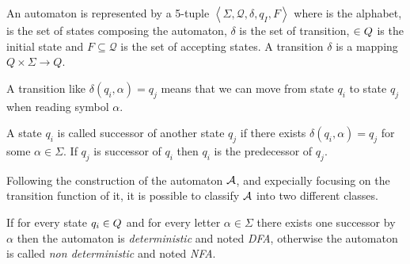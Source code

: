 


\begin{definition}[Automaton]
  An automaton \automaton{} is represented by a 5-tuple $\left\langle \Sigma, \mathcal{Q}, \delta, q_I, F\right\rangle $ where \alphabet{} is the alphabet, \states{} is the set of states composing the automaton, $\delta$ is the set of transition, \qzero{} $\in Q{}$ is the initial state and $F \subseteq \mathcal{Q}$ is the set of accepting states. A transition $\delta$ is a mapping $Q \times \Sigma \rightarrow Q$.
\end{definition}

\begin{example}
  A transition like $\delta(q_i, \alpha) = q_j$ means that we can move from state $q_i$ to state $q_j$ when reading symbol $\alpha$.
\end{example}

A state $q_i$ is called successor of another state $q_j$ if there exists $\delta(q_i, \alpha) = q_j$ for some $\alpha \in \Sigma$. If $q_j$ is successor of $q_i$ then $q_i$ is the predecessor of $q_j$.

Following the construction of the automaton $\mathcal{A}$, and expecially focusing on the transition function of it, it is possible to classify $\mathcal{A}$ into two different classes.

\begin{definition}
  If for every state $q_i \in Q{}$ and for every letter $\alpha \in \Sigma$ there exists one successor by $\alpha$ then the automaton is \textit{deterministic} and noted \textit{DFA}, otherwise the automaton is called \textit{non deterministic} and noted \textit{NFA}.
\end{definition}


